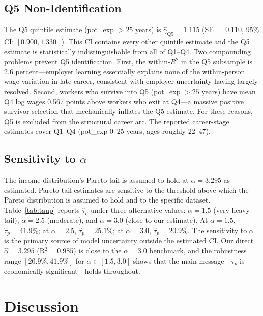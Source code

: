\documentclass[12pt]{article}
\theoremstyle{definition}
\theoremstyle{remark}
\begin{document}
\subsection{Q5 Non-Identification}

The Q5 quintile estimate (pot\_exp $> 25$ years) is $\hat{\gamma}_{\text{Q5}} = 1.115$
(SE $= 0.110$, 95\% CI: $[0.900, 1.330]$). This CI contains every other quintile estimate
and the Q5 estimate is statistically indistinguishable from all of Q1--Q4. Two compounding
problems prevent Q5 identification. First, the within-$R^2$ in the Q5 subsample is 2.6
percent---employer learning essentially explains none of the within-person wage variation
in late career, consistent with employer uncertainty having largely resolved. Second, workers
who survive into Q5 (pot\_exp $> 25$ years) have mean Q4 log wages 0.567 points above workers
who exit at Q4---a massive positive survivor selection that mechanically inflates the Q5
estimate. For these reasons, Q5 is excluded from the structural career arc. The reported
career-stage estimates cover Q1--Q4 (pot\_exp 0--25 years, ages roughly 22--47).

\subsection{Sensitivity to $\alpha$}

The income distribution's Pareto tail is assumed to hold at $\alpha = 3.295$ as estimated.
Pareto tail estimates are sensitive to the threshold above which the Pareto distribution is
assumed to hold and to the specific dataset. Table~\ref{tab:taup} reports $\hat{\tau}_p$
under three alternative values: $\alpha = 1.5$ (very heavy tail), $\alpha = 2.5$ (moderate),
and $\alpha = 3.0$ (close to our estimate). At $\alpha = 1.5$, $\hat{\tau}_p = 41.9\%$; at
$\alpha = 2.5$, $\hat{\tau}_p = 25.1\%$; at $\alpha = 3.0$, $\hat{\tau}_p = 20.9\%$. The
sensitivity to $\alpha$ is the primary source of model uncertainty outside the estimated
CI. Our direct $\hat{\alpha} = 3.295$ (R$^2 = 0.985$) is close to the $\alpha = 3.0$
benchmark, and the robustness range $[20.9\%, 41.9\%]$ for $\alpha \in [1.5, 3.0]$ shows
that the main message---$\tau_p$ is economically significant---holds throughout.

\section{Discussion}
\label{sec:discussion}
\end{document}
